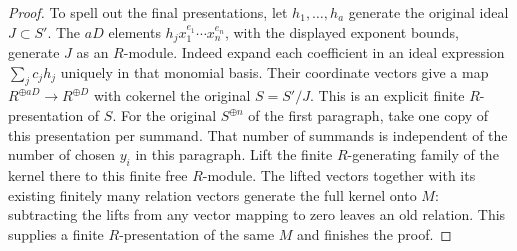 \begin{proof}
To spell out the final presentations, let $h_1,\ldots,h_a$
generate the original ideal $J\subset S'$. The $aD$ elements
$h_j x_1^{e_1}\cdots x_n^{e_n}$, with the displayed exponent
bounds, generate $J$ as an $R$-module. Indeed expand each
coefficient in an ideal expression $\sum_j c_jh_j$ uniquely
in that monomial basis. Their coordinate vectors give a map
$R^{\oplus aD}\to R^{\oplus D}$ with cokernel the original
$S=S'/J$. This is an explicit finite $R$-presentation of $S$.
For the original $S^{\oplus n}$ of the first paragraph, take
one copy of this presentation per summand. That number of summands
is independent of the number of chosen $y_i$ in this paragraph.
Lift the finite $R$-generating family
of the kernel there to this finite free $R$-module. The lifted
vectors together with its existing finitely many relation vectors
generate the full kernel onto $M$: subtracting the lifts from
any vector mapping to zero leaves an old relation. This supplies
a finite $R$-presentation of the same $M$ and finishes the proof.
\end{proof}